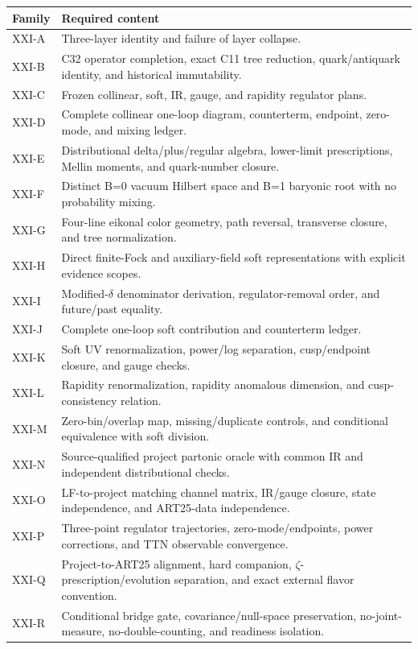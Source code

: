 \documentclass[11pt]{article}
\begin{document}
\begin{longtable}{L{0.15\textwidth}L{0.76\textwidth}}
\toprule
Family & Required content\\
\midrule
\endhead
XXI-A & Three-layer identity and failure of layer collapse.\\
XXI-B & C32 operator completion, exact C11 tree reduction, quark/antiquark identity, and historical immutability.\\
XXI-C & Frozen collinear, soft, IR, gauge, and rapidity regulator plans.\\
XXI-D & Complete collinear one-loop diagram, counterterm, endpoint, zero-mode, and mixing ledger.\\
XXI-E & Distributional delta/plus/regular algebra, lower-limit prescriptions, Mellin moments, and quark-number closure.\\
XXI-F & Distinct B=0 vacuum Hilbert space and B=1 baryonic root with no probability mixing.\\
XXI-G & Four-line eikonal color geometry, path reversal, transverse closure, and tree normalization.\\
XXI-H & Direct finite-Fock and auxiliary-field soft representations with explicit evidence scopes.\\
XXI-I & Modified-\(\delta\) denominator derivation, regulator-removal order, and future/past equality.\\
XXI-J & Complete one-loop soft contribution and counterterm ledger.\\
XXI-K & Soft UV renormalization, power/log separation, cusp/endpoint closure, and gauge checks.\\
XXI-L & Rapidity renormalization, rapidity anomalous dimension, and cusp-consistency relation.\\
XXI-M & Zero-bin/overlap map, missing/duplicate controls, and conditional equivalence with soft division.\\
XXI-N & Source-qualified project partonic oracle with common IR and independent distributional checks.\\
XXI-O & LF-to-project matching channel matrix, IR/gauge closure, state independence, and ART25-data independence.\\
XXI-P & Three-point regulator trajectories, zero-mode/endpoints, power corrections, and TTN observable convergence.\\
XXI-Q & Project-to-ART25 alignment, hard companion, \(\zeta\)-prescription/evolution separation, and exact external flavor convention.\\
XXI-R & Conditional bridge gate, covariance/null-space preservation, no-joint-measure, no-double-counting, and readiness isolation.\\
\bottomrule
\end{longtable}
\end{document}
